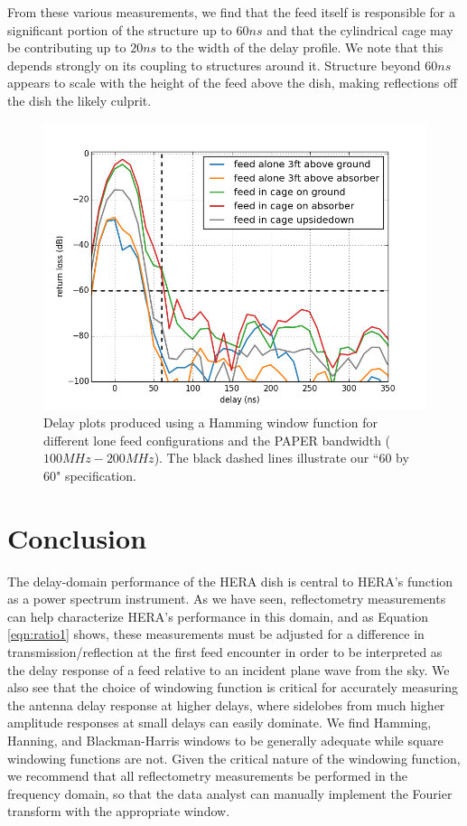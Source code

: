 \documentclass[12pt,preprint]{aastex}
\begin{document}
From these various measurements, we find that the feed itself is responsible for a significant portion of the structure up to $60ns$ and
that the cylindrical cage may be contributing up to $20ns$ to the width of the delay profile. We note that this depends strongly
on its coupling to structures around it. Structure beyond $60ns$ appears to scale
with the height of the feed above the dish, making reflections off the dish the likely culprit.

\begin{figure}[H]
\centering
\includegraphics[totalheight=0.41\textheight]{plots/delay_feed.png}
\caption{Delay plots produced using a Hamming window function for different lone feed configurations and the PAPER bandwidth ($100MHz-200MHz$). The black dashed lines illustrate our ``60 by 60" specification.}
\label{fig:outofthedish}
\end{figure}

\section{Conclusion}

The delay-domain performance of the HERA dish is central to HERA's function as a power spectrum instrument.
As we have seen, reflectometry measurements can help characterize HERA's performance in this domain, and
as Equation \ref{eqn:ratio1} shows, these measurements must be adjusted for a difference in transmission/reflection
at the first feed encounter in order to be interpreted as the delay response of a feed relative to an incident
plane wave from the sky.  We also see that the choice of windowing function is critical for accurately measuring the
antenna delay response at higher delays, where sidelobes from much higher amplitude responses at small delays can easily
dominate.  We find Hamming, Hanning, and Blackman-Harris windows to be generally adequate while square windowing functions are not.
Given the critical nature of the windowing function, we recommend that all reflectometry measurements be performed in the
frequency domain, so that the data analyst can manually implement the Fourier transform with the appropriate window.
\end{document}
